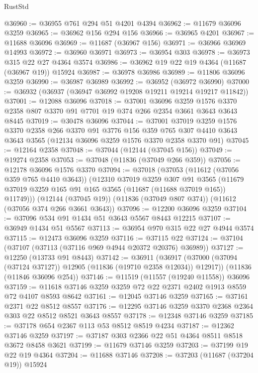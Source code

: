 \begin{lexlean}{RustStd}
\begin{coremodule}
@36960 := @36955 @761 @294 @51 @4201 @4394
@36962 := @11679 @36096 @3259
@36965 := @36962 @156 @294 @156
@36966 := @36965 @4201
@36967 := @11688 @36096
@36969 := @11687 (@36967 @156)
@36971 := @36966 @36969 @14993
@36972 := @36960 @36971
@36973 := @36954 @303
@36978 := @36973 @315 @22 @27 @4364 @3574
@36986 := @36962 @19 @22 @19 @4364 (@11687 (@36967 @19)) @15924
@36987 := @36978 @36986
@36989 := @11806 @36096 @3259
@36990 := @36987 @36989
@36992 := @36952 (@36972 @36990)
@37000 := @36932 (@36937 (@36947 @36992 @19208 @19211 @19214 @19217 @11842))
@37001 := @12088 @36096
@37018 := @37001
    @36096
    @3259
    @1576
    @3370
    @2358
    @807
    @3370
    @91
    @7701
    @19
    @374
    @266
    @2354
    @3661
    @3643
    @3643
    @8445
@37019 := @30478 @36096
@37044 := @37001
    @37019
    @3259
    @1576
    @3370
    @2358
    @266
    @3370
    @91
    @3776
    @156
    @359
    @765
    @307
    @4410
    @3643
    @3643
    @3565
    (@12134 @36096 @3259 @1576 @3370 @2358 @3370 @91)
@37045 := @12164 @2358
@37048 := @37044 (@12144 (@37045 @156))
@37049 := @19274 @2358
@37053 := @37048 (@11836 (@37049 @266 @359))
@37056 := @12178 @36096 @1576 @3370
@37094 := @37018
    (@37053
      (@11612 (@37056 @359 @765 @4410 @3643))
      (@12310
        @37019
        @3259
        @307
        @91
        @3565
        (@11679 @37019 @3259 @165 @91 @165 @3565 (@11687 (@11688 @37019 @165)) @11749)))
    (@12144 (@37045 @19))
    (@11836 (@37049 @807 @374))
    (@11612 (@37056 @374 @266 @3661 @3643))
@37096 := @12200 @36096 @3259
@37104 := @37096 @534 @91 @1434 @51 @3643 @5567 @8443 @12215
@37107 := @36949 @1434 @51 @5567
@37113 := @36954 @970 @315 @22 @27 @4944 @3574
@37115 := @12473 @36096 @3259
@37116 := @37115 @22
@37124 := @37104 (@37107 (@37113 (@37116 @969 @4944 @20372 @20376) @36989))
@37127 := @12250 (@13733 @91 @8443)
@37142 := @36911
    (@36917 (@37000 (@37094 (@37124 @37127)) @12905 (@11836 (@19710 @2358 @12034)) @12917))
    (@11836 (@11846 @36096 @254))
@37146 := @11519 (@11557 (@19240 @11558)) @36096
@37159 := @11618 @37146 @3259 @3259 @72 @22 @2371 @2402 @1913 @8559 @72 @4107 @8593 @8642
@37161 := @12045 @37146 @3259
@37165 := @37161 @2371 @22 @8512 @8557
@37176 := @12295 @37146 @3259 @3370 @2368 @2364 @303 @22 @8512 @8521 @3643 @8557
@37178 := @12348 @37146 @3259
@37185 := @37178 @654 @2367 @113 @53 @8512 @8519 @4234
@37187 := @12362 @37146 @3259
@37197 := @37187 @303 @2366 @22 @51 @4364 @8511 @8518 @3672 @8458 @3621
@37199 := @11679 @37146 @3259
@37203 := @37199 @19 @22 @19 @4364
@37204 := @11688 @37146
@37208 := @37203 (@11687 (@37204 @19)) @15924

\end{coremodule}
\end{lexlean}
